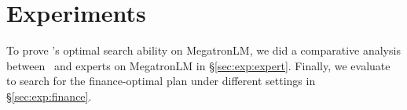 \section{Experiments}\label{sec:exp}


To prove \sysname's optimal search ability on MegatronLM, we did a comparative analysis between \sysname\ and experts on MegatronLM in \S\ref{sec:exp:expert}.
Finally, we evaluate \sysname to search for the finance-optimal plan under different settings in \S\ref{sec:exp:finance}.

%
%

